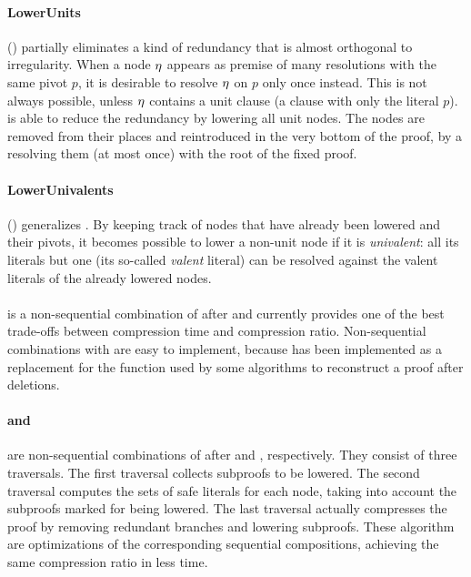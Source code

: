\documentclass{llncs}
\begin{document}
\paragraph{LowerUnits} () \cite{LURPI} partially eliminates a kind of redundancy that is almost orthogonal to irregularity. When a node $\eta$ appears as premise of many resolutions
with the same pivot $p$, it is desirable to resolve $\eta$ on $p$ only once instead. This is not always possible, unless $\eta$ contains a unit clause (a clause with only the literal $p$).
 is able to reduce the redundancy by lowering all unit nodes. The nodes are removed from their places and reintroduced in the very bottom of the proof, by a resolving them (at most once) with the root of the fixed proof. 


\paragraph{LowerUnivalents} () \cite{LUniv} generalizes . By
keeping track of nodes that have already been lowered and their pivots, it becomes
possible to lower a non-unit node if it is \emph{univalent}: all its literals but one (its so-called \emph{valent} literal) can be resolved against the valent literals of the already lowered nodes. 


\paragraph{} \cite{LUniv} is a non-sequential combination of  after  and currently provides one of the best trade-offs between compression time and compression ratio. Non-sequential combinations with  are easy to implement, because  has been implemented as a replacement for the  function used by some algorithms to reconstruct a proof after deletions. 
%

\paragraph{ and } are non-sequential combinations of  after 
and , respectively. They consist of three traversals. The first traversal collects subproofs to be
lowered. The second traversal computes the sets of safe literals for each node,
taking into account the subproofs marked for being lowered. The last traversal actually compresses the proof by removing redundant branches and lowering subproofs. These algorithm are optimizations of the corresponding sequential compositions, achieving the
same compression ratio in less time. 
\end{document}
